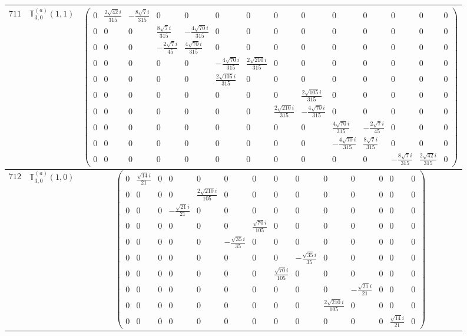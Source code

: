 \documentclass[fleqn,8pt,landscape]{jsarticle}
\begin{document}
\begin{center}
\begin{longtable}{ccc}
$ 711 $ & $ \mathbb{T}_{3,0}^{(a)}(1,1) $ & $ \begin{pmatrix} 0 & \frac{2 \sqrt{42} i}{315} & - \frac{8 \sqrt{7} i}{315} & 0 & 0 & 0 & 0 & 0 & 0 & 0 & 0 & 0 & 0 & 0 \\ 0 & 0 & 0 & \frac{8 \sqrt{7} i}{315} & - \frac{4 \sqrt{70} i}{315} & 0 & 0 & 0 & 0 & 0 & 0 & 0 & 0 & 0 \\ 0 & 0 & 0 & - \frac{2 \sqrt{7} i}{45} & \frac{4 \sqrt{70} i}{315} & 0 & 0 & 0 & 0 & 0 & 0 & 0 & 0 & 0 \\ 0 & 0 & 0 & 0 & 0 & - \frac{4 \sqrt{70} i}{315} & \frac{2 \sqrt{210} i}{315} & 0 & 0 & 0 & 0 & 0 & 0 & 0 \\ 0 & 0 & 0 & 0 & 0 & \frac{2 \sqrt{105} i}{315} & 0 & 0 & 0 & 0 & 0 & 0 & 0 & 0 \\ 0 & 0 & 0 & 0 & 0 & 0 & 0 & 0 & \frac{2 \sqrt{105} i}{315} & 0 & 0 & 0 & 0 & 0 \\ 0 & 0 & 0 & 0 & 0 & 0 & 0 & \frac{2 \sqrt{210} i}{315} & - \frac{4 \sqrt{70} i}{315} & 0 & 0 & 0 & 0 & 0 \\ 0 & 0 & 0 & 0 & 0 & 0 & 0 & 0 & 0 & \frac{4 \sqrt{70} i}{315} & - \frac{2 \sqrt{7} i}{45} & 0 & 0 & 0 \\ 0 & 0 & 0 & 0 & 0 & 0 & 0 & 0 & 0 & - \frac{4 \sqrt{70} i}{315} & \frac{8 \sqrt{7} i}{315} & 0 & 0 & 0 \\ 0 & 0 & 0 & 0 & 0 & 0 & 0 & 0 & 0 & 0 & 0 & - \frac{8 \sqrt{7} i}{315} & \frac{2 \sqrt{42} i}{315} & 0 \end{pmatrix} $ \\ \hline
$ 712 $ & $ \mathbb{T}_{3,0}^{(a)}(1,0) $ & $ \begin{pmatrix} 0 & \frac{\sqrt{14} i}{21} & 0 & 0 & 0 & 0 & 0 & 0 & 0 & 0 & 0 & 0 & 0 & 0 \\ 0 & 0 & 0 & 0 & \frac{2 \sqrt{210} i}{105} & 0 & 0 & 0 & 0 & 0 & 0 & 0 & 0 & 0 \\ 0 & 0 & 0 & - \frac{\sqrt{21} i}{21} & 0 & 0 & 0 & 0 & 0 & 0 & 0 & 0 & 0 & 0 \\ 0 & 0 & 0 & 0 & 0 & 0 & \frac{\sqrt{70} i}{105} & 0 & 0 & 0 & 0 & 0 & 0 & 0 \\ 0 & 0 & 0 & 0 & 0 & - \frac{\sqrt{35} i}{35} & 0 & 0 & 0 & 0 & 0 & 0 & 0 & 0 \\ 0 & 0 & 0 & 0 & 0 & 0 & 0 & 0 & - \frac{\sqrt{35} i}{35} & 0 & 0 & 0 & 0 & 0 \\ 0 & 0 & 0 & 0 & 0 & 0 & 0 & \frac{\sqrt{70} i}{105} & 0 & 0 & 0 & 0 & 0 & 0 \\ 0 & 0 & 0 & 0 & 0 & 0 & 0 & 0 & 0 & 0 & - \frac{\sqrt{21} i}{21} & 0 & 0 & 0 \\ 0 & 0 & 0 & 0 & 0 & 0 & 0 & 0 & 0 & \frac{2 \sqrt{210} i}{105} & 0 & 0 & 0 & 0 \\ 0 & 0 & 0 & 0 & 0 & 0 & 0 & 0 & 0 & 0 & 0 & 0 & \frac{\sqrt{14} i}{21} & 0 \end{pmatrix} $ \\ \hline

\end{longtable}
\end{center}
\end{document}
